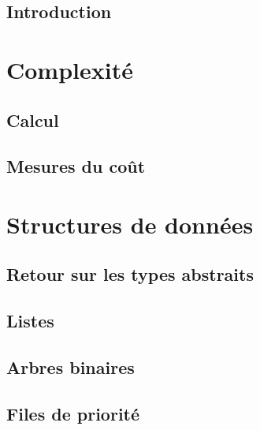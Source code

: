 \documentclass{minitelreport}
\begin{document}
\begin{refsection}
	\section*{Introduction}
	
	\chapter{Complexité}
	\label{cha:complexite}
		\section{Calcul}
			\label{sec:calcul}
			
		\section{Mesures du coût} %
			\label{sec:mesures_du_cout}
			
	\chapter{Structures de données}
	\label{cha:structures_de_donn_es_classiques}
		\section{Retour sur les types abstraits} %
			\label{sec:type_abstrait_de_donn_es}
			
		\newpage
		\section{Listes}
			\label{sec:listes}
			
		\newpage
		\section{Arbres binaires}
			\label{sec:arbres_binaires}
			
		\newpage
		\section{Files de priorité}
			\label{sec:files_de_priorite}
			
		\newpage

\end{refsection}
\end{document}

